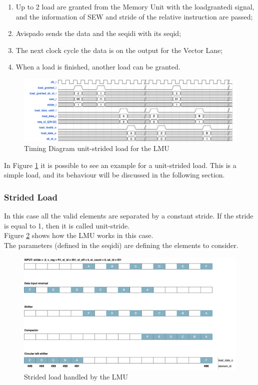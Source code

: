 \begin{enumerate}
    \item Up to 2 load are granted from the Memory Unit with the load\+granted\+i signal, and the information of SEW and stride of the relative instruction are passed;
    
    \item Avispado sends the data and the seq\+id\+i with its seq\+id;
    
    \item The next clock cycle the data is on the output for the Vector Lane;
    
    \item When a load is finished, another load can be granted.
\end{enumerate}

\begin{figure}[H]
    \centering
    \includegraphics[scale = 0.35]{Chapter_2/img/lmu-time.png}
    \caption{Timing Diagram unit-strided load for the LMU}
    \label{lmu-time}
\end{figure}

In Figure \ref{lmu-time} it is possible to see an example for a unit-strided load. This is a simple load, and its behaviour will be discussed in the following section.

\subsubsection{Strided Load}
In this case all the valid elements are separated by a constant stride. If the stride is equal to 1, then it is called unit-stride.\\

Figure \ref{lmu-strided} shows how the LMU works in this case.\\
The parameters (defined in the seq\+id\+i) are defining the elements to consider.
\begin{figure}[H]
    \centering
    \includegraphics[scale = 0.25]{Chapter_2/img/lmu-strided.png}
    \caption{Strided load handled by the LMU}
    \label{lmu-strided}
\end{figure}

